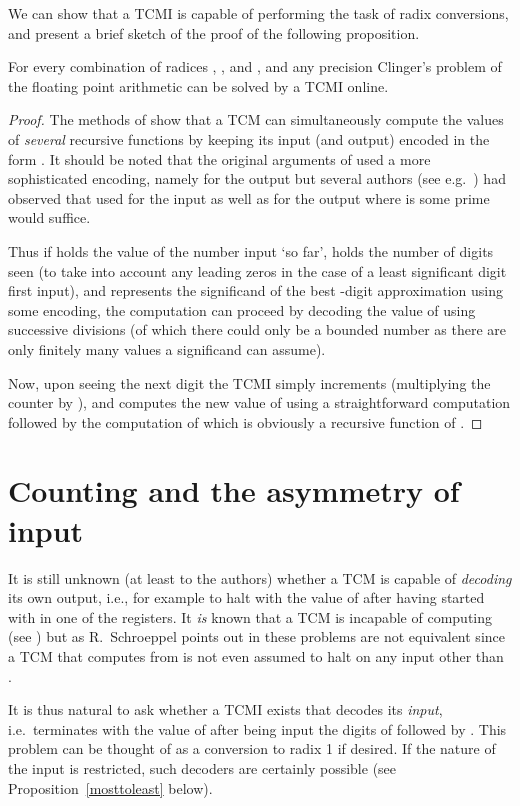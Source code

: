 \documentclass[12pt]{article}
\begin{document}
We can show that a TCMI is capable of performing the task
of radix conversions, and present a brief sketch of the proof of the
following proposition.
\begin{proposition}\label{tcmo}
For every combination of radices , , and
  , and any precision 
Clinger's problem of the floating point arithmetic can be solved
by a TCMI online.
\end{proposition}
\begin{proof}
The methods of \cite{Minsky} show that a TCM can simultaneously
compute the values of {\it several\/} recursive functions
 by keeping its input (and output) encoded in the form
. It should be noted that the original
arguments of \cite{Minsky} used a more sophisticated encoding, namely  for the output but
several authors (see e.g.~\cite{Bardz}) had observed that  used
for the input as well as  for the output where  is some prime would
suffice. 

Thus if  holds the value of the
number input `so far',  holds the number of digits seen (to take
into account any leading zeros in the case of a least significant
digit first input), and  represents the significand
of the best -digit approximation using some encoding, the
computation can proceed by decoding the value of  using
successive divisions (of which there could only be a bounded number as
there are only finitely many values a significand can assume).

Now, upon seeing the next digit the TCMI simply increments
 (multiplying the counter by ), and computes the new value of
 using a straightforward computation followed by the computation
of  which is obviously a recursive function of .
\end{proof}

\section{Counting and the asymmetry of input}

It is still unknown (at least to the authors) whether a TCM is capable
of {\it decoding\/} its own output, i.e., for example to halt with the
value of  after having started with  in one of the registers.
It {\it is} known that a TCM is incapable of computing  (see \cite{Schroep}) but as R.~Schroeppel points out
in \cite{Schroep} these problems are not equivalent since a TCM that
computes  from  is not even assumed to halt on any input other than
.

It is thus natural to ask whether a TCMI exists that decodes its
{\it input\/}, i.e.~terminates with the value of  after being input the
digits of  followed by . This problem can be thought of as a
conversion to radix 1 if desired. If the nature of the input is
restricted, such decoders are certainly possible (see
Proposition~\ref{mosttoleast} below). 
\end{document}
